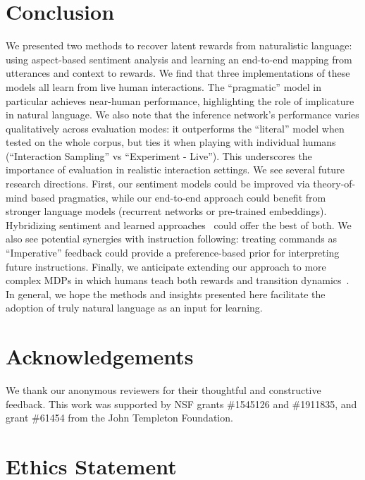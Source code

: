 \documentclass[letterpaper]{article} %
\begin{document}
\section{Conclusion}
\label{conclusion_section}
We presented two methods to recover latent rewards from naturalistic language: using aspect-based sentiment analysis and learning an end-to-end mapping from utterances and context to rewards. We find that three implementations of these models all learn from live human interactions. The ``pragmatic'' model in particular achieves near-human performance, highlighting the role of implicature in natural language. We also note that the inference network's performance varies qualitatively across evaluation modes: it outperforms the ``literal'' model when tested on the whole corpus, but ties it when playing with individual humans (``Interaction Sampling'' vs ``Experiment - Live''). This underscores the importance of evaluation in realistic interaction settings.  We see several future research directions. First, our sentiment models could be improved via theory-of-mind based pragmatics, while our end-to-end approach could benefit from stronger language models (recurrent networks or pre-trained embeddings). Hybridizing sentiment and learned approaches~\cite{jiang2011target, xu2019bertsentiment} could offer the best of both. We also see potential synergies with instruction following: treating commands as ``Imperative'' feedback could provide a preference-based prior for interpreting future instructions. Finally, we anticipate extending our approach to more complex MDPs in which humans teach both rewards and transition dynamics~\cite{narasimhan2018grounding}. In general, we hope the methods and insights presented here facilitate the adoption of truly natural language as an input for learning.



\vspace{-0.79mm}
\vspace{-1.83mm}
\section*{Acknowledgements}
We thank our anonymous reviewers for their thoughtful and constructive feedback. This work was supported by NSF grants \#1545126 and \#1911835, and grant \#61454 from the John Templeton Foundation.

\section*{Ethics Statement}
\end{document}
